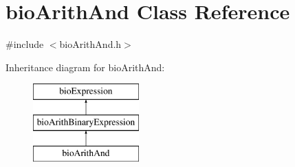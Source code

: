 \hypertarget{classbio_arith_and}{}\section{bio\+Arith\+And Class Reference}
\label{classbio_arith_and}


{\ttfamily \#include $<$bio\+Arith\+And.\+h$>$}

Inheritance diagram for bio\+Arith\+And\+:\begin{figure}[H]
\begin{center}
\leavevmode
\includegraphics[height=3.000000cm]{classbio_arith_and}
\end{center}
\end{figure}
